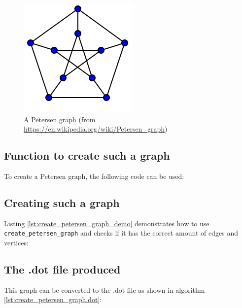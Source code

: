 \begin{figure}[!htbp]
  \includegraphics[]{Petersen_graph.png}
  \caption{
    A Petersen graph 
    (from \url{https://en.wikipedia.org/wiki/Petersen_graph}) 
  }
  \label{fig:create_petersen_graph}
\end{figure}

\subsection{Function to create such a graph}

To create a Petersen graph, the following code can be used:



\subsection{Creating such a graph}

Listing \ref{lst:create_petersen_graph_demo}
demonstrates how to use \verb;create_petersen_graph; and checks if it has the
correct amount of edges and vertices:



\subsection{The .dot file produced}
\label{subsec:create_petersen_graph.dot}

This graph can be converted to the .dot file as shown in algorithm 
\ref{lst:create_petersen_graph.dot}:



